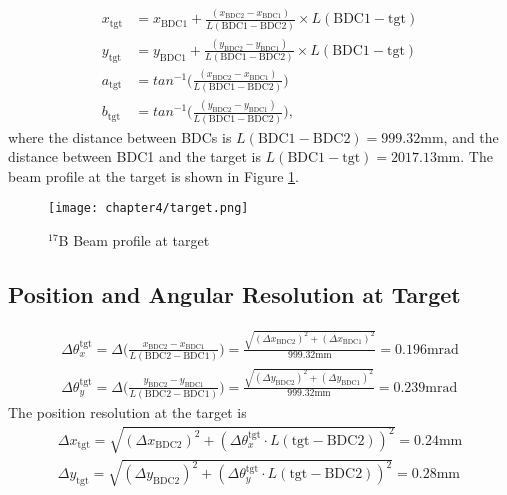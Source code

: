\begin{align}
    x_{\text{tgt}} &= x_{\text{BDC1}} + \frac{(x_{\text{BDC2}} - x_{\text{BDC1}})}{L(\text{BDC1} - \text{BDC2})} \times L(\text{BDC1} - \text{tgt})\\
    y_{\text{tgt}} &= y_{\text{BDC1}} + \frac{(y_{\text{BDC2}} - y_{\text{BDC1}})}{L(\text{BDC1} - \text{BDC2})} \times L(\text{BDC1} - \text{tgt})\\
    a_{\text{tgt}} &= tan^{-1} \bigg( \frac{(x_{\text{BDC2}} - x_{\text{BDC1}})}{L(\text{BDC1} - \text{BDC2})} \bigg)\\
    b_{\text{tgt}} &= tan^{-1} \bigg( \frac{(y_{\text{BDC2}} - y_{\text{BDC1}})}{L(\text{BDC1} - \text{BDC2})} \bigg),
\end{align}
where the distance between BDCs is $L(\text{BDC1} - \text{BDC2}) = 999.32$mm, and the distance between BDC1 and the target is $L(\text{BDC1} - \text{tgt}) = 2017.13$mm. The beam profile at the target is shown in Figure \ref{fig:beam_profile_tgt}.
\begin{figure}[h]
    \centering
    \texttt{[image: chapter4/target.png]}
    \caption{${}^{17}$B Beam profile at target}
    \label{fig:beam_profile_tgt}
\end{figure}

\subsection{Position and Angular Resolution at Target}
\begin{align}
    \Delta \theta_x^{\text{tgt}} = \Delta \bigg( \frac{x_{\text{BDC2}} - x_{\text{BDC1}}}{L(\text{BDC2} - \text{BDC1})} \bigg) 
    = \frac{\sqrt{(\Delta x_{\text{BDC2}})^2 + (\Delta x_{\text{BDC1}})^2}}{999.32 \text{mm}} = 0.196 \text{mrad}\\
    \Delta \theta^{\text{tgt}}_y = \Delta \Big( \frac{y_{\text{BDC2}} - y_{\text{BDC1}}}{L(\text{BDC2} - \text{BDC1})} \Big) 
    = \frac{\sqrt{(\Delta y_{\text{BDC2}})^2 + (\Delta y_{\text{BDC1}})^2}}{999.32 \text{mm}} = 0.239 \text{mrad}
\end{align}
The position resolution at the target is
\begin{align}
    \Delta x_{\text{tgt}} = \sqrt{(\Delta x_{\text{BDC2}})^2 + (\Delta \theta_x^{\text{tgt}} \cdot L(\text{tgt} - \text{BDC2}))^2} = 0.24 \text{mm}\\ 
    \Delta y_{\text{tgt}} = \sqrt{(\Delta y_{\text{BDC2}})^2 + (\Delta \theta_y^{\text{tgt}} \cdot L(\text{tgt} - \text{BDC2}))^2} = 0.28 \text{mm}
\end{align}

